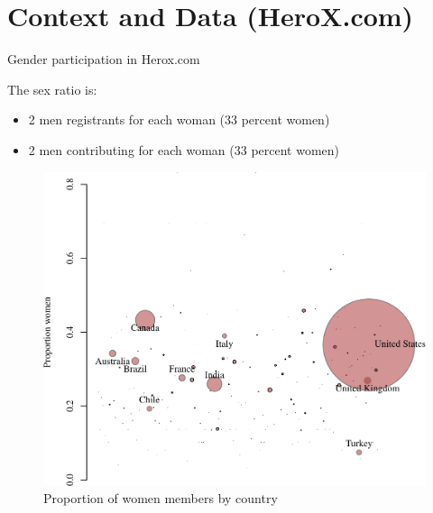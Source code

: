 \section{Context and Data (HeroX.com)}\label{context-and-data-herox.com}

\begin{frame}{Gender participation in Herox.com}

The sex ratio is:

\begin{itemize}
\tightlist
\item
  2 men registrants for each woman (33 percent women)
\item
  2 men contributing for each woman (33 percent women)
\end{itemize}

\end{frame}

\begin{frame}

\begin{figure}
\centering
\includegraphics{Figures/bayes-1.pdf}
\caption{Proportion of women members by country}
\end{figure}

\end{frame}

